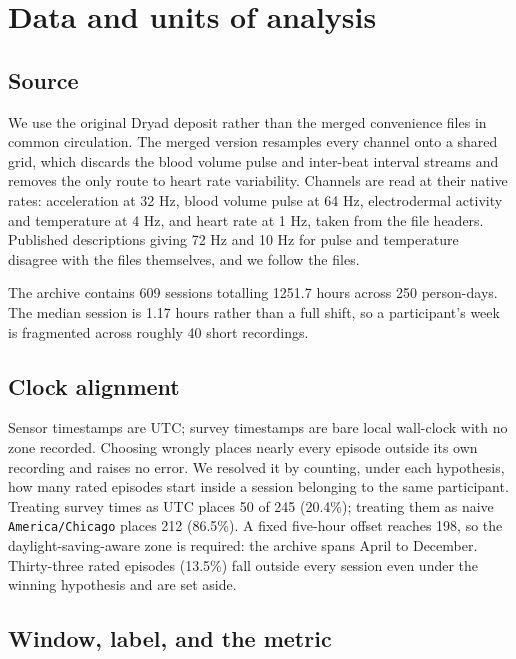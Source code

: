\documentclass{article}
\begin{document}
\section{Data and units of analysis}
\label{sec:data}

\subsection{Source}

We use the original Dryad deposit rather than the merged convenience files in
common circulation. The merged version resamples every channel onto a shared
grid, which discards the blood volume pulse and inter-beat interval streams and
removes the only route to heart rate variability. Channels are read at their
native rates: acceleration at 32 Hz, blood volume pulse at
64 Hz, electrodermal activity and temperature at 4 Hz, and
heart rate at 1 Hz, taken from the file headers. Published
descriptions giving 72 Hz and 10 Hz for pulse and
temperature disagree with the files themselves, and we follow the files.

The archive contains 609 sessions totalling 1251.7 hours across 250
person-days. The median session is 1.17 hours rather than a full shift,
so a participant's week is fragmented across roughly 40 short recordings.

\subsection{Clock alignment}

Sensor timestamps are UTC; survey timestamps are bare local wall-clock with no
zone recorded. Choosing wrongly places nearly every episode outside its own
recording and raises no error. We resolved it by counting, under each
hypothesis, how many rated episodes start inside a session belonging to the
same participant. Treating survey times as UTC places 50 of 245
(20.4\%); treating them as naive \texttt{America/Chicago} places
212 (86.5\%). A fixed five-hour offset reaches 198, so the
daylight-saving-aware zone is required: the archive spans April to December.
Thirty-three rated episodes (13.5\%) fall outside every session
even under the winning hypothesis and are set aside.

\subsection{Window, label, and the metric}
\label{sec:metric}
\end{document}
